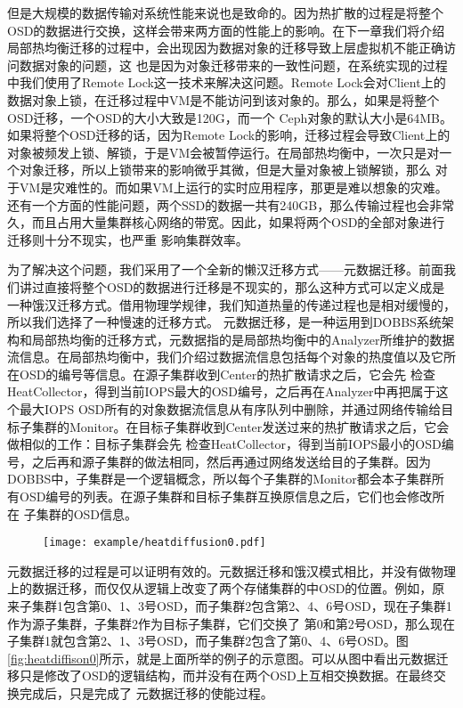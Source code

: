 但是大规模的数据传输对系统性能来说也是致命的。因为热扩散的过程是将整个OSD的数据进行交换，这样会带来两方面的性能上的影响。在下一章我们将介绍局部热均衡迁移的过程中，会出现因为数据对象的迁移导致上层虚拟机不能正确访问数据对象的问题，这
也是因为对象迁移带来的一致性问题，在系统实现的过程中我们使用了Remote Lock这一技术来解决这问题。Remote Lock会对Client上的数据对象上锁，在迁移过程中VM是不能访问到该对象的。那么，如果是将整个OSD迁移，一个OSD的大小大致是120G，而一个
Ceph对象的默认大小是64MB。如果将整个OSD迁移的话，因为Remote Lock的影响，迁移过程会导致Client上的对象被频发上锁、解锁，于是VM会被暂停运行。在局部热均衡中，一次只是对一个对象迁移，所以上锁带来的影响微乎其微，但是大量对象被上锁解锁，那么
对于VM是灾难性的。而如果VM上运行的实时应用程序，那更是难以想象的灾难。还有一个方面的性能问题，两个SSD的数据一共有240GB，那么传输过程也会非常久，而且占用大量集群核心网络的带宽。因此，如果将两个OSD的全部对象进行迁移则十分不现实，也严重
影响集群效率。

为了解决这个问题，我们采用了一个全新的懒汉迁移方式——元数据迁移。前面我们讲过直接将整个OSD的数据进行迁移是不现实的，那么这种方式可以定义成是一种饿汉迁移方式。借用物理学规律，我们知道热量的传递过程也是相对缓慢的，所以我们选择了一种慢速的迁移方式。
元数据迁移，是一种运用到DOBBS系统架构和局部热均衡的迁移方式，元数据指的是局部热均衡中的Analyzer所维护的数据流信息。在局部热均衡中，我们介绍过数据流信息包括每个对象的热度值以及它所在OSD的编号等信息。在源子集群收到Center的热扩散请求之后，它会先
检查HeatCollector，得到当前IOPS最大的OSD编号，之后再在Analyzer中再把属于这个最大IOPS OSD所有的对象数据流信息从有序队列中删除，并通过网络传输给目标子集群的Monitor。在目标子集群收到Center发送过来的热扩散请求之后，它会做相似的工作：目标子集群会先
检查HeatCollector，得到当前IOPS最小的OSD编号，之后再和源子集群的做法相同，然后再通过网络发送给目的子集群。因为DOBBS中，子集群是一个逻辑概念，所以每个子集群的Monitor都会本子集群所有OSD编号的列表。在源子集群和目标子集群互换原信息之后，它们也会修改所在
子集群的OSD信息。

\begin{figure}[!htp]
    \centering
    \texttt{[image: example/heatdiffusion0.pdf]}
\end{figure}

元数据迁移的过程是可以证明有效的。元数据迁移和饿汉模式相比，并没有做物理上的数据迁移，而仅仅从逻辑上改变了两个存储集群的中OSD的位置。例如，原来子集群1包含第0、1、3号OSD，而子集群2包含第2、4、6号OSD，现在子集群1作为源子集群，子集群2作为目标子集群，它们交换了
第0和第2号OSD，那么现在子集群1就包含第2、1、3号OSD，而子集群2包含了第0、4、6号OSD。图\ref{fig:heatdiffison0}所示，就是上面所举的例子的示意图。可以从图中看出元数据迁移只是修改了OSD的逻辑结构，而并没有在两个OSD上互相交换数据。在最终交换完成后，只是完成了
元数据迁移的使能过程。

